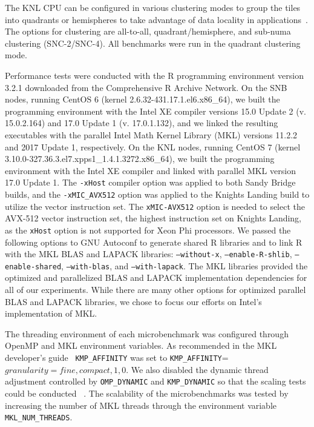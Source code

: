 The KNL CPU can be configured in various clustering modes to group the tiles into
quadrants or hemispheres to take advantage of data locality in
applications~\cite{vladimirov:knlModes}. The options for clustering are all-to-all,
quadrant/hemisphere, and sub-numa clustering (SNC-2/SNC-4). All benchmarks were run in the
quadrant clustering mode.

Performance tests were conducted with the R programming environment version 3.2.1
downloaded from the Comprehensive R Archive Network. On the SNB nodes, running CentOS 6
(kernel 2.6.32-431.17.1.el6.x86\_64), we built the programming environment with the Intel
XE compiler versions 15.0 Update 2 (v. 15.0.2.164) and 17.0 Update 1 (v. 17.0.1.132), and
we linked the resulting executables with the parallel Intel Math Kernel Library (MKL)
versions 11.2.2 and 2017 Update 1, respectively. On the KNL nodes, running CentOS 7
(kernel 3.10.0-327.36.3.el7.xpps1\_1.4.1.3272.x86\_64), we built the programming
environment with the Intel XE compiler and linked with parallel MKL version 17.0 Update 1.
The \texttt{-xHost} compiler option was applied to both Sandy Bridge builds, and the
\texttt{-xMIC\_AVX512} option was applied to the Knights Landing build to utilize the
vector instruction set. The \texttt{xMIC-AVX512} option is needed to select the AVX-512
vector instruction set, the highest instruction set on Knights Landing, as the
\texttt{xHost} option is not supported for Xeon Phi processors. We passed the following
options to GNU Autoconf to generate shared R libraries and to link R with the MKL BLAS and
LAPACK libraries: \texttt{--without-x}, \texttt{--enable-R-shlib},
\texttt{--enable-shared}, \texttt{--with-blas}, and \texttt{--with-lapack}. The MKL
libraries provided the optimized and parallelized BLAS and LAPACK implementation
dependencies for all of our experiments. While there are many other options for optimized parallel BLAS and LAPACK libraries, we chose to focus our efforts on Intel's implementation of MKL.

The threading environment of each microbenchmark was configured through OpenMP and MKL
environment variables. As recommended in the MKL developer's guide~\cite{intel:mkl2017}
\texttt{KMP\_AFFINITY} was set to \texttt{KMP\_AFFINITY}=$granularity=fine,compact,1,0$.
We also disabled the dynamic thread adjustment controlled by \texttt{OMP\_DYNAMIC} and
\texttt{KMP\_DYNAMIC} so that the scaling tests could be conducted ~\cite{intel:cpp2015,
intel:cpp2017, intel:mkl11_2, intel:mkl2017}. The scalability of the microbenchmarks was
tested by increasing the number of MKL threads through the environment variable
\texttt{MKL\_NUM\_THREADS}.

